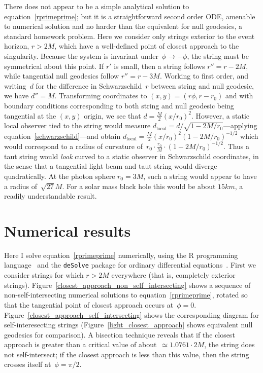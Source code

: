 \documentclass{ws-tpe}
\begin{document}
There does not appear to be a simple analytical solution to
equation~\ref{rprimeprime}; but it is a straightforward second order
ODE, amenable to numerical solution and no harder than the equivalent
for null geodesics, a standard homework problem.  Here we consider
only strings exterior to the event horizon, $r>2M$, which have a
well-defined point of closest approach to the singularity.  Because
the system is invariant under~$\phi\longrightarrow-\phi$, the string
must be symmetrical about this point.  If $r'$ is small, then a string
follows $r''=r-2M$, while tangential null geodesics follow $r''=r-3M$.
Working to first order, and writing~$d$ for the difference in
Schwarzschild~$r$ between string and null geodesic, we have $d''=M$.
Transforming coordinates to $(x,y) = (r\phi,r-r_0)$ and with boundary
conditions corresponding to both string and null geodesic being
tangential at the $(x,y)$ origin, we see that
$d=\frac{M}{2}(x/r_0)^2$.  However, a static local observer tied to
the string would measure
$d_\mathrm{local}=d/\sqrt{1-2M/r_0}$---applying
equation~\ref{schwarzschild}---and obtain
$d_\mathrm{local}=\frac{M}{2}(x/r_0)^2\left(1-2M/r_0\right)^{-1/2}$
which would correspond to a radius of curvature
of~$r_0\cdot\frac{r_0}{M}\cdot\left(1-2M/r_0\right)^{-1/2}$.  Thus a
taut string would {\em look} curved to a static observer in
Schwarzschild coordinates, in the sense that a tangential light beam
and taut string would diverge quadratically.  At the photon sphere
$r_0=3M$, such a string would appear to have a radius of~$\sqrt{27}M$.
For a solar mass black hole this would be about $15\unit{km}$, a
readily understandable result.


\section{Numerical results}

Here I solve equation~\ref{rprimeprime} numerically, using the R
programming language~\cite{rcore2019} and the \verb+deSolve+ package
for ordinary differential equations~\cite{soetart2010}.  First we
consider strings for which $r>2M$ everywhere (that is, completely
exterior strings).
Figure~\ref{closest_approach_non_self_intersecting} shows a sequence
of non-self-intersecting numerical solutions to
equation~\ref{rprimeprime}, rotated so that the tangential point of
closest approach occurs at~$\phi=0$.
Figure~\ref{closest_approach_self_intersecting} shows the
corresponding diagram for self-interesecting strings
(Figure~\ref{light_closest_approach} shows equivalent null geodesics
for comparison).  A bisection technique reveals that if the closest
approach is greater than a critical value of about~$\simeq 1.0761\cdot
2M$, the string does not self-intersect; if the closest approach is
less than this value, then the string crosses itself at~$\phi=\pi/2$.
\end{document}
